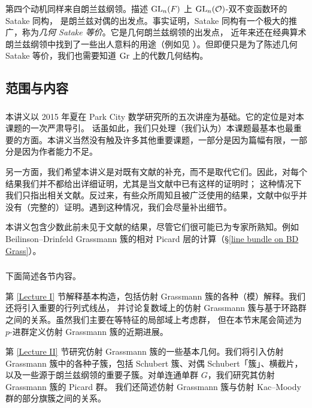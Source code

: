 第四个动机同样来自朗兰兹纲领。描述 ${\operatorname{GL}}_n(F)$ 上 ${\operatorname{GL}}_n({\mathcal O})$-双不变函数环的 Satake 同构，
是朗兰兹对偶的出发点。事实证明，Satake 同构有一个极大的推广，称为\emph{几何 Satake 等价}。它是几何朗兰兹纲领的出发点，
近年来还在经典算术朗兰兹纲领中找到了一些出人意料的用途（例如见 \cite{Laf}）。但即便只是为了陈述几何 Satake 等价，我们也需要知道 ${\operatorname{Gr}}$ 上的代数几何结构。

\subsection{范围与内容}

\subsubsection{} 本讲义以 2015 年夏在 Park City 数学研究所的五次讲座为基础。它的定位是对本课题的一次严肃导引。
话虽如此，我们只处理（我们认为）本课题最基本也最重要的方面。本讲义当然没有触及许多其他重要课题，一部分是因为篇幅有限，一部分是因为作者能力不足。

另一方面，我们希望本讲义是对既有文献的补充，而不是取代它们。因此，对每个结果我们并不都给出详细证明，尤其是当文献中已有这样的证明时；
这种情况下我们只指出相关文献。反过来，有些众所周知且被广泛使用的结果，文献中似乎并没有（完整的）证明。遇到这种情况，我们会尽量补出细节。

本讲义包含少数此前未见于文献的结果，尽管它们很可能已为专家所熟知。例如 Beilinson--Drinfeld Grassmann 簇的相对 Picard 层的计算（\S\ref{line bundle on BD Grass}）。

\subsubsection{} 下面简述各节内容。

第 \ref{Lecture I} 节解释基本构造，包括仿射 Grassmann 簇的各种（模）解释。我们还将引入重要的行列式线丛，
并讨论复数域上的仿射 Grassmann 簇与基于环路群之间的关系。虽然我们主要在等特征的局部域上考虑群，
但在本节末尾会简述为 $p$-进群定义仿射 Grassmann 簇的近期进展。

第 \ref{Lecture II} 节研究仿射 Grassmann 簇的一些基本几何。我们将引入仿射 Grassmann 簇中的各种子簇，包括 Schubert 簇、对偶 Schubert「簇」、横截片，
以及一些源于朗兰兹纲领的重要子簇。对单连通单群 $G$，我们研究其仿射 Grassmann 簇的 Picard 群。
我们还简述仿射 Grassmann 簇与仿射 Kac--Moody 群的部分旗簇之间的关系。

